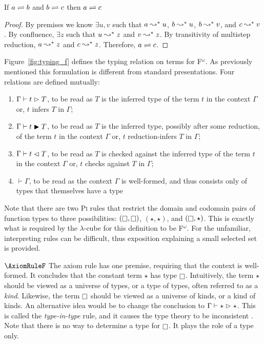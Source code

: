 \begin{theorem}
    \label{thm:1:trans}
    If $a \rightleftharpoons b$ and $b \rightleftharpoons c$ then $a \rightleftharpoons c$
\end{theorem}
\begin{proof}
    By premises we know $\exists u, v$ such that $a \leadsto^* u$, $b \leadsto^* u$, $b \leadsto^* v$, and $c \leadsto^* v$.
    By confluence, $\exists z$ such that $u \leadsto^* z$ and $v \leadsto^* z$.
    By transitivity of multistep reduction, $a \leadsto^* z$ and $c \leadsto^* z$.
    Therefore, $a \rightleftharpoons c$.
\end{proof}



Figure~\ref{fig:typing_f} defines the typing relation on terms for F$^\omega$.
As previously mentioned this formulation is different from standard presentations.
Four relations are defined mutually:
\begin{enumerate}
    \item $\Gamma \vdash t \vartriangleright T$, to be read as $T$ is the inferred type of the term $t$ in the context $\Gamma$ or, $t$ infers $T$ in $\Gamma$;
    \item $\Gamma \vdash t \blacktriangleright T$, to be read as $T$ is the inferred type, possibly after some reduction, of the term $t$ in the context $\Gamma$ or, $t$ reduction-infers $T$ in $\Gamma$;
    \item $\Gamma \vdash t \vartriangleleft T$, to be read as $T$ is checked against the inferred type of the term $t$ in the context $\Gamma$ or, $t$ checks against $T$ in $\Gamma$;
    \item $\vdash \Gamma$, to be read as the context $\Gamma$ is well-formed, and thus consists only of types that themselves have a type
\end{enumerate}
Note that there are two \textsc{Pi} rules that restrict the domain and codomain pairs of function types to three possibilities: $(\kind, \kind)$, $(\star, \star)$, and $(\kind, \star)$.
This is exactly what is required by the $\lambda$-cube for this definition to be F$^\omega$.
For the unfamiliar, interpreting rules can be difficult, thus exposition explaining a small selected set is provided.

$\AxiomRuleF$ The axiom rule has one premise, requiring that the context is well-formed.
It concludes that the constant term $\star$ has type $\kind$.
Intuitively, the term $\star$ should be viewed as a universe of types, or a type of types, often referred to as a \textit{kind}.
Likewise, the term $\kind$ should be viewed as a universe of kinds, or a kind of kinds.
An alternative idea would be to change the conclusion to $\Gamma \vdash \star \vartriangleright \star$.
This is called the \textit{type-in-type} rule, and it causes the type theory to be inconsistent \cite{girard1972,hurkens1995}.
Note that there is no way to determine a type for $\kind$.
It plays the role of a type only.

